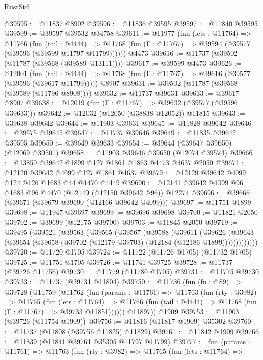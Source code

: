 \begin{lexlean}{RustStd}
\begin{coremodule}
@39595 := @11837 @8902
@39596 := @11836 @39595
@39597 := @11840 @39595
@39599 := @39597 @39532 @34758
@39611 := @11977
    (fun (lets : @11764) =>
    @11766
      (fun (tail : @4444) =>
      @11768 (fun (Γ : @11767) => @39594 (@39577 (@39596 (@39599 @11797 @11799))))))
    @4473
@39616 := @11737 (@39502 (@11787 (@39568 (@39589 @13111))))
@39617 := @39599 @4473
@39626 := @12001
    (fun (tail : @4444) => @11768 (fun (Γ : @11767) => @39616 (@39577 (@39596 (@39617 @11799)))))
    @8907
@39631 := @39502 (@11787 (@39568 (@39589 (@11796 @8908))))
@39632 := @11737 @39631
@39633 := @39617 @8907
@39638 := @12019 (fun (Γ : @11767) => @39632 (@39577 (@39596 @39633)))
@39642 := @12032 (@12050 (@38838 @12052)) @11815
@39643 := @39638 @39642
@39644 := @11903 @39631
@39645 := @11828 @39642
@39646 := @39575 @39645
@39647 := @11737 @39646
@39649 := @11835 @39642 @39595
@39650 := @39649 @39633
@39654 := @39644 (@39647 @39650) (@12069 @39501)
@39658 := @11903 @39646 @39650 (@12074 @39574)
@39666 := @13850 @39642 @1899 @127 @1861 @1863 @4473 @4637 @2050
@39671 := @12120 @39642 @4099 @127 @1861 @4637
@39679 := @12129 @39642 @4099 @124 @126 @1683 @44 @4470 @4449
@39690 := @12141 @39642 @4099 @96 @1683 @96 @4470 (@12149 (@12150 @39642 @96)) @12274
@39696 := @39666 (@39671 (@39679 @39690 (@12166 @39642 @4099)))
@39697 := @11751 @1899
@39698 := @11947 @39697
@39699 := @39696 @39698
@39700 := @11821 @2050
@39702 := @39699 (@12175 @39700)
@39703 := @11845 @2050
@39719 := @39495
    (@39521
      (@39563
        (@39565
          (@39567
            (@39588
              (@39611
                (@39626
                  (@39643 (@39654 (@39658 (@39702 (@12179 @39703) (@12184 (@12186 @1899)))))))))))))
@39720 := @11720 @1705
@39724 := @11722 (@11726 @1705) (@11732 @1705)
@39725 := @11751 @1705
@39726 := @11741 @39725
@39728 := @11737 (@39726 @11756)
@39730 := @11779 (@11780 @1705)
@39731 := @11775 @39730
@39733 := @11737 (@39731 @11804)
@39750 := @11736
    (fun (fn : @89) =>
    @39728
      (@11759
        (@11762
          (fun (params : @11761) =>
          @11763
            (fun (rty : @3982) =>
            @11765
              (fun (lets : @11764) =>
              @11766 (fun (tail : @4444) => @11768 (fun (Γ : @11767) => @39733 @11851))))))
        @11897))
    @1909
@39753 := @11903 (@39726 (@11754 @1909))
@39756 := @11816 (@11817 @1909) @35302
@39760 := @11737 (@11808 (@39756 @11825) @11829)
@39761 := @11842 @1909
@39766 := @11839 (@11841 @39761 @35305 @11797 @11799)
@39777 := fun (params : @11761) =>
  @11763
    (fun (rty : @3982) =>
    @11765
      (fun (lets : @11764) =>

\end{coremodule}
\end{lexlean}
